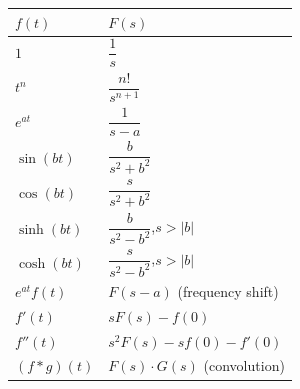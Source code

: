 \documentclass[12pt, a4paper]{article}
\theoremstyle{definition}
\theoremstyle{remark}
\begin{document}
\begin{center}
\begin{tabular}{ll}
\toprule
$f(t)$ & $F(s)$ \\
\midrule
$1$          & $\dfrac{1}{s}$ \\[8pt]
$t^n$        & $\dfrac{n!}{s^{n+1}}$ \\[8pt]
$e^{at}$     & $\dfrac{1}{s-a}$ \\[8pt]
$\sin(bt)$   & $\dfrac{b}{s^2+b^2}$ \\[8pt]
$\cos(bt)$   & $\dfrac{s}{s^2+b^2}$ \\[8pt]
$\sinh(bt)$  & $\dfrac{b}{s^2-b^2}$,\quad $s>|b|$ \\[8pt]
$\cosh(bt)$  & $\dfrac{s}{s^2-b^2}$,\quad $s>|b|$ \\[8pt]
$e^{at}f(t)$ & $F(s-a)$ \quad (frequency shift) \\[8pt]
$f'(t)$      & $sF(s)-f(0)$ \\[8pt]
$f''(t)$     & $s^2F(s)-sf(0)-f'(0)$ \\[8pt]
$(f*g)(t)$   & $F(s)\cdot G(s)$ \quad (convolution) \\
\bottomrule
\end{tabular}
\end{center}
\end{document}
